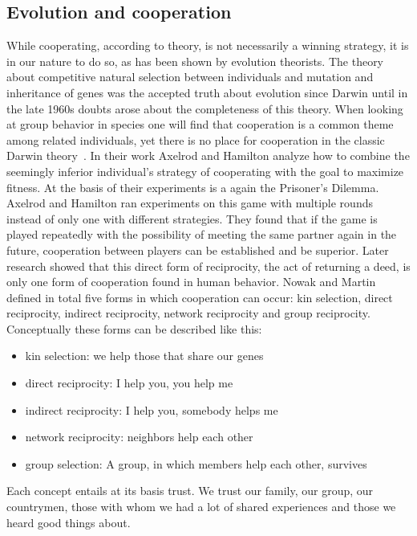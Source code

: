 \subsection{Evolution and cooperation}
\label{sec:evolution}
While cooperating, according to theory, is not necessarily a winning strategy, it is in our nature 
to do so, as has been shown by evolution theorists. The theory about competitive natural selection 
between individuals and mutation and inheritance of genes was the accepted truth about evolution 
since Darwin until in the late 1960s doubts arose about the completeness of this 
theory. When looking at group behavior in species one will find that cooperation is a common theme
among related individuals, yet there is no place for cooperation in the classic Darwin 
theory~\cite{Axelrod1390}. In their work Axelrod and Hamilton \cite{Axelrod1390} 
analyze how to combine the seemingly inferior individual's strategy of cooperating with the goal to 
maximize fitness. At the basis of their experiments is a again the Prisoner's 
Dilemma. Axelrod and Hamilton ran experiments on this game with multiple rounds instead of only one with
different strategies. They found that if the game is played repeatedly with the possibility of 
meeting the same partner again in the future, cooperation between players can be established and be
superior. Later research showed that this direct form of reciprocity, the act of returning a deed,
is only one form of cooperation found in human behavior. Nowak and 
Martin~\cite{nowak2006five} defined in total five forms in which cooperation can occur: kin selection, direct
reciprocity, indirect reciprocity, network reciprocity and group reciprocity. Conceptually these 
forms can be described like this:

\begin{itemize}
    \item kin selection: we help those that share our genes
    \item direct reciprocity: I help you, you help me
    \item indirect reciprocity: I help you, somebody helps me
    \item network reciprocity: neighbors help each other
    \item group selection: A group, in which members help each other, survives
\end{itemize}

Each concept entails at its basis trust. We trust our family, our group, our countrymen, those with whom we had a lot
of shared experiences and those we heard good things about. 

